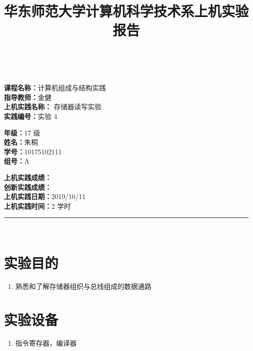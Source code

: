 \documentclass[a4paper,10pt,UTF8]{paper}
\title{华东师范大学计算机科学技术系上机实验报告}
\numberwithin{equation}{section}
\numberwithin{figure}{section}
\begin{document}
\pagestyle{fancy}
\lhead{}
\rhead{}
\makeatletter
\def\headrule{{\if@fancyplain\let\headrulewidth\plainheadrulewidth\fi%
\color{gray}\hrule\@height 0.2pt\@width\headwidth}
  \vspace{6mm}}
\makeatother

\newcommand{\HRule}{\rule{\linewidth}{1mm}}
\newcommand{\dai}{\textbf{Dais-CMX16$^+$}}

{ \\ [0.8cm]

\small{
  \begin{minipage}[t]{.32\linewidth}
    \textbf{课程名称：}计算机组成与结构实践\\
    \textbf{指导教师：}金健\\
    \textbf{上机实践名称：} 存储器读写实验\\
    \textbf{实践编号：}实验 4
  \end{minipage}
  \begin{minipage}[t]{.32\linewidth}
    \textbf{年级：}17 级\\
    \textbf{姓名：}朱桐\\
    \textbf{学号：}10175102111\\
    \textbf{组号：}A
  \end{minipage} 
  \begin{minipage}[t]{.32\linewidth}
    \textbf{上机实践成绩：} \\
    \textbf{创新实践成绩：} \\
    \textbf{上机实践日期：}2019/10/11\\
    \textbf{上机实践时间：}2 学时\\
  \end{minipage}
}
\HRule \\[0.5cm]
}
\section{实验目的}

\begin{enumerate}
    \item 熟悉和了解存储器组织与总线组成的数据通路
\end{enumerate}

\section{实验设备}

\begin{enumerate}
    \item 指令寄存器，编译器
\end{enumerate}
\end{document}
